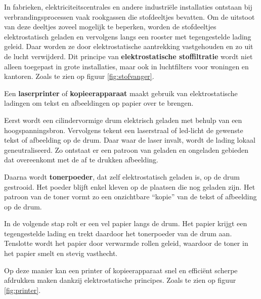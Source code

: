 \begin{toepassing}
In fabrieken, elektriciteitscentrales en andere industriële installaties ontstaan bij verbrandingsprocessen vaak rookgassen die stofdeeltjes bevatten. Om de uitstoot van deze deeltjes zoveel mogelijk te beperken, worden de stofdeeltjes elektrostatisch geladen en vervolgens langs een rooster met tegengestelde lading geleid. Daar worden ze door elektrostatische aantrekking vastgehouden en zo uit de lucht verwijderd.
Dit principe van \textbf{elektrostatische stoffiltratie} wordt niet alleen toegepast in grote installaties, maar ook in luchtfilters voor woningen en kantoren. Zoals te zien op figuur \ref{fig:stofvanger}.
\end{toepassing}
%
	\begin{marginfigure}
	\begin{center}
	\end{center}
	\vspace*{-5mm}
	\end{marginfigure}
\begin{toepassing}
Een \textbf{laserprinter} of \textbf{kopieerapparaat} maakt gebruik van elektrostatische ladingen om tekst en afbeeldingen op papier over te brengen.

Eerst wordt een cilindervormige drum elektrisch geladen met behulp van een hoogspanningsbron. Vervolgens tekent een laserstraal of led-licht de gewenste tekst of afbeelding op de drum. Daar waar de laser invalt, wordt de lading lokaal geneutraliseerd. Zo ontstaat er een patroon van geladen en ongeladen gebieden dat overeenkomt met de af te drukken afbeelding.

Daarna wordt \textbf{tonerpoeder}, dat zelf elektrostatisch geladen is, op de drum gestrooid. Het poeder blijft enkel kleven op de plaatsen die nog geladen zijn. Het patroon van de toner vormt zo een onzichtbare “kopie” van de tekst of afbeelding op de drum.

In de volgende stap rolt er een vel papier langs de drum. Het papier krijgt een tegengestelde lading en trekt daardoor het tonerpoeder van de drum aan. Tenslotte wordt het papier door verwarmde rollen geleid, waardoor de toner in het papier smelt en stevig vasthecht.

Op deze manier kan een printer of kopieerapparaat snel en efficiënt scherpe afdrukken maken dankzij elektrostatische principes. Zoals te zien op figuur \ref{fig:printer}.

\end{toepassing}
